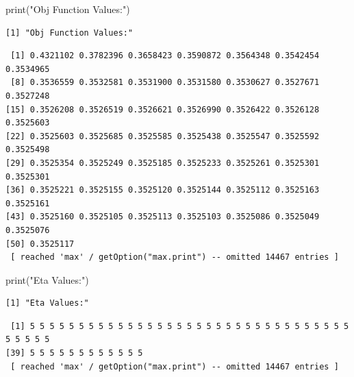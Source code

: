 \documentclass[
  letterpaper,
  DIV=11,
  numbers=noendperiod]{scrartcl}
\newenvironment{Shaded}{\begin{snugshade}}{\end{snugshade}}
\newcommand{\FunctionTok}[1]{\textcolor[rgb]{0.28,0.35,0.67}{#1}}
\newcommand{\NormalTok}[1]{\textcolor[rgb]{0.00,0.23,0.31}{#1}}
\newcommand{\SpecialCharTok}[1]{\textcolor[rgb]{0.37,0.37,0.37}{#1}}
\newcommand{\StringTok}[1]{\textcolor[rgb]{0.13,0.47,0.30}{#1}}
\begin{document}
\begin{Shaded}
\begin{Highlighting}[]
\FunctionTok{print}\NormalTok{(}\StringTok{"Obj Function Values:"}\NormalTok{)}
\end{Highlighting}
\end{Shaded}

\begin{verbatim}
[1] "Obj Function Values:"
\end{verbatim}

\begin{Shaded}
\end{Shaded}

\begin{verbatim}
 [1] 0.4321102 0.3782396 0.3658423 0.3590872 0.3564348 0.3542454 0.3534965
 [8] 0.3536559 0.3532581 0.3531900 0.3531580 0.3530627 0.3527671 0.3527248
[15] 0.3526208 0.3526519 0.3526621 0.3526990 0.3526422 0.3526128 0.3525603
[22] 0.3525603 0.3525685 0.3525585 0.3525438 0.3525547 0.3525592 0.3525498
[29] 0.3525354 0.3525249 0.3525185 0.3525233 0.3525261 0.3525301 0.3525301
[36] 0.3525221 0.3525155 0.3525120 0.3525144 0.3525112 0.3525163 0.3525161
[43] 0.3525160 0.3525105 0.3525113 0.3525103 0.3525086 0.3525049 0.3525076
[50] 0.3525117
 [ reached 'max' / getOption("max.print") -- omitted 14467 entries ]
\end{verbatim}

\begin{Shaded}
\begin{Highlighting}[]
\FunctionTok{print}\NormalTok{(}\StringTok{"Eta Values:"}\NormalTok{)}
\end{Highlighting}
\end{Shaded}

\begin{verbatim}
[1] "Eta Values:"
\end{verbatim}

\begin{Shaded}
\end{Shaded}

\begin{verbatim}
 [1] 5 5 5 5 5 5 5 5 5 5 5 5 5 5 5 5 5 5 5 5 5 5 5 5 5 5 5 5 5 5 5 5 5 5 5 5 5 5
[39] 5 5 5 5 5 5 5 5 5 5 5 5
 [ reached 'max' / getOption("max.print") -- omitted 14467 entries ]
\end{verbatim}
\end{document}
